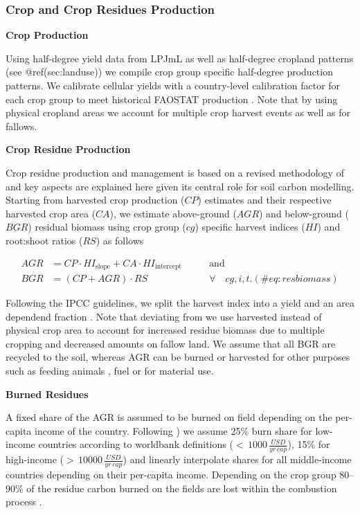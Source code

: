 \documentclass[gc, manuscript]{copernicus}
\begin{document}
\hypertarget{sec:residues}{%
\subsubsection{Crop and Crop Residues Production}\label{sec:residues}}

\textbf{Crop Production}

Using half-degree yield data from LPJmL \citep{schaphoff_lpjml4_2018} as
well as half-degree cropland patterns (see @ref(sec:landuse)) we compile
crop group specific half-degree production patterns. We calibrate
cellular yields with a country-level calibration factor for each crop
group to meet historical FAOSTAT production
\citep{faostat_faostat_2016}. Note that by using physical cropland areas
we account for multiple crop harvest events as well as for fallows.

\textbf{Crop Residue Production}

Crop residue production and management is based on a revised methodology
of \citep{bodirsky_n2o_2012} and key aspects are explained here given
its central role for soil carbon modelling. Starting from harvested crop
production (\(CP\)) estimates and their respective harvested crop area
(\(CA\)), we estimate above-ground (\(AGR\)) and below-ground (\(BGR\))
residual biomass using crop group (\(cg\)) specific harvest indices
(\(HI\)) and root:shoot ratios (\(RS\)) as follows

\begin{equation}
\begin{aligned}
AGR & = CP \cdot HI_{\textrm{slope}} + CA \cdot HI_{\textrm{intercept}}\qquad & \textrm{and} \\
BGR & = (CP + AGR) \cdot RS \qquad                                            & \forall\quad cg, i, t.
(\#eq:resbiomass)
\end{aligned}
\end{equation}

Following the IPCC guidelines, we split the harvest index into a yield
and an area dependend fraction \citep{ipcc_2006_2006}. Note that
deviating from \citep{bodirsky_n2o_2012} we use harvested instead of
physical crop area to account for increased residue biomass due to
multiple cropping and decreased amounts on fallow land. We assume that
all BGR are recycled to the soil, whereas AGR can be burned or harvested
for other purposes such as feeding animals \citep{weindl}, fuel or for
material use.

\textbf{Burned Residues}

A fixed share of the AGR is assumed to be burned on field depending on
the per-capita income of the country. Following \citep{smil1999}) we
assume 25\% burn share for low-income countries according to worldbank
definitions (\(<\,1000\,\tfrac{USD}{yr\,cap}\)), 15\% for high-income
(\(>\,10000\,\tfrac{USD}{yr\,cap}\)) and linearly interpolate shares for
all middle-income countries depending on their per-capita income.
Depending on the crop group 80--90\% of the residue carbon burned on the
fields are lost within the combustion process \citep{ipcc_2006_2006}.
\end{document}

